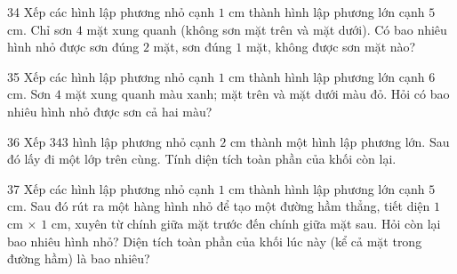 \begin{probbox}{34}{}
Xếp các hình lập phương nhỏ cạnh $1$ cm thành hình lập phương lớn cạnh $5$ cm. Chỉ sơn $4$ mặt xung quanh (không sơn mặt trên và mặt dưới). Có bao nhiêu hình nhỏ được sơn đúng $2$ mặt, sơn đúng $1$ mặt, không được sơn mặt nào?
\end{probbox}
\gap
\begin{probbox}{35}{}
Xếp các hình lập phương nhỏ cạnh $1$ cm thành hình lập phương lớn cạnh $6$ cm. Sơn $4$ mặt xung quanh màu xanh; mặt trên và mặt dưới màu đỏ. Hỏi có bao nhiêu hình nhỏ được sơn cả hai màu?
\end{probbox}
\gap
\begin{probbox}{36}{}
Xếp $343$ hình lập phương nhỏ cạnh $2$ cm thành một hình lập phương lớn. Sau đó lấy đi một lớp trên cùng. Tính diện tích toàn phần của khối còn lại.
\end{probbox}
\gap
\begin{probbox}{37}{}
Xếp các hình lập phương nhỏ cạnh $1$ cm thành hình lập phương lớn cạnh $5$ cm. Sau đó rút ra một hàng hình nhỏ để tạo một đường hầm thẳng, tiết diện $1$ cm $\times$ $1$ cm, xuyên từ chính giữa mặt trước đến chính giữa mặt sau. Hỏi còn lại bao nhiêu hình nhỏ? Diện tích toàn phần của khối lúc này (kể cả mặt trong đường hầm) là bao nhiêu?
\end{probbox}
